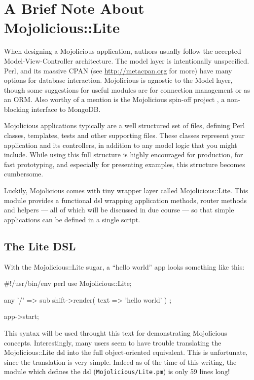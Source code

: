\section{A Brief Note About Mojolicious::Lite}


When designing a Mojolicious application, authors usually follow the accepted Model-View-Controller architecture.
The model layer is intentionally unspecified.
Perl, and its massive CPAN (see \url{http://metacpan.org} for more) have many options for database interaction.
Mojolicious is agnostic to the Model layer, though some suggestions for useful modules are  for connection management or  as an ORM.
Also worthy of a mention is the Mojolicious spin-off project , a non-blocking interface to MongoDB.

Mojolicious applications typically are a well structured set of files, defining Perl classes, templates, tests and other supporting files.
These classes represent your application and its controllers, in addition to any model logic that you might include.
While using this full structure is highly encouraged for production, for fast prototyping, and especially for presenting examples, this structure becomes cumbersome.

Luckily, Mojolicious comes with tiny wrapper layer called Mojolicious::Lite.
This module provides a functional dsl wrapping application methods, router methods and helpers --- all of which will be discussed in due course --- so that simple applications can be defined in a single script.

\subsection{The Lite DSL}

With the Mojolicious::Lite sugar, a ``hello world'' app looks something like this:
\begin{mojolite}
#!/usr/bin/env perl
use Mojolicious::Lite;

any '/' => sub { shift->render( text => 'hello world' ) };

app->start;
\end{mojolite}

This syntax will be used throught this text for demonstrating Mojolicious concepts.
Interestingly, many users seem to have trouble translating the Mojolicious::Lite dsl into the full object-oriented equivalent.
This is unfortunate, since the translation is very simple.
Indeed as of the time of this writing, the module which defines the dsl (\verb!Mojolicious/Lite.pm!) is only 59 lines long!

